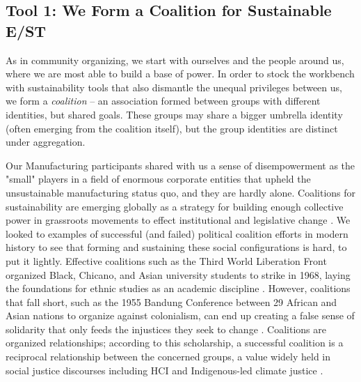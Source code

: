 \documentclass[manuscript,review,anonymous]{acmart}
\begin{document}
\subsection{Tool 1: We Form a Coalition for Sustainable E/ST}
As in community organizing, we start with ourselves and the people around us, where we are most able to build a base of power.
 In order to stock the workbench with sustainability tools that also dismantle the unequal privileges between us, we form a \textit{coalition} -- 
an association formed between groups with different identities, but shared goals. 
These groups may share a bigger umbrella identity (often emerging from the coalition itself), but the group identities are distinct under aggregation. 

Our Manufacturing participants shared with us a sense of disempowerment as the "small" players in a field of enormous corporate entities that upheld the unsustainable manufacturing status quo, and they are hardly alone. Coalitions for sustainability are emerging globally as a strategy for building enough collective power in grassroots movements to effect institutional and legislative change \cite{noauthor_movement_nodate, hess_sustainability_2014}. We looked to examples of successful (and failed) political coalition efforts in modern history to see that forming and sustaining these social configurations is hard, to put it lightly. Effective coalitions such as the Third World Liberation Front organized Black, Chicano, and Asian university students to  strike in 1968, laying the foundations for ethnic studies as an academic discipline \cite{npr_student_nodate}. However, coalitions that fall short, such as the 1955 Bandung Conference between 29 African and Asian nations to organize against colonialism, can end up creating a false sense of solidarity that only feeds the injustices they seek to change \cite{nopper_illusion_2015}. Coalitions are organized relationships; according to this scholarship, a successful coalition is a reciprocal relationship between the concerned groups, a value widely held in social justice discourses including HCI \cite{dombrowski_social_2016} and Indigenous-led climate justice \cite{hobart_radical_2020, whyte_indigenous_2017, gomez-barris_extractive_2017}.
\end{document}

